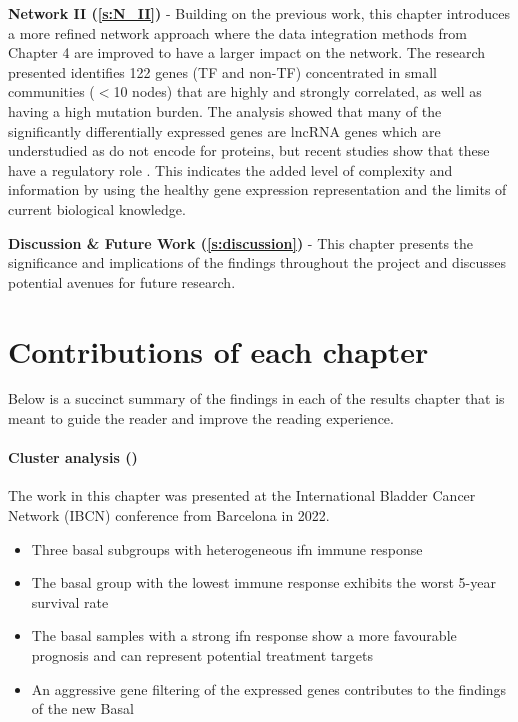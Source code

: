 \textbf{Network II (\cref{s:N_II})} - Building on the previous work, this chapter introduces a more refined network approach where the data integration methods from Chapter 4 are improved to have a larger impact on the network. The research presented identifies 122 genes (TF and non-TF) concentrated in small communities (\(<\)10 nodes) that are highly and strongly correlated, as well as having a high mutation burden. The analysis showed that many of the significantly differentially expressed genes are \acrlong{lncRNA} genes which are understudied as do not encode for proteins, but recent studies show that these have a regulatory role \citep{Statello2021-md}. This indicates the added level of complexity and information by using the healthy gene expression representation and the limits of current biological knowledge.


\textbf{Discussion \& Future Work (\cref{s:discussion})} - This chapter presents the significance and implications of the findings throughout the project and discusses potential avenues for future research.


\section{Contributions of each chapter}

Below is a succinct summary of the findings in each of the results chapter that is meant to guide the reader and improve the reading experience.

\paragraph*{Cluster analysis ()}

The work in this chapter was presented at the International Bladder Cancer Network (IBCN) conference from Barcelona in 2022.


\begin{itemize}
    \item Three basal subgroups with heterogeneous \acrfull{ifn} immune response
    \item The basal group with the lowest immune response exhibits the worst 5-year survival rate
    \item The basal samples with a strong \acrshort{ifn} response show a more favourable prognosis and can represent potential treatment targets
    \item An aggressive gene filtering of the expressed genes contributes to the findings of the new Basal 
\end{itemize}

